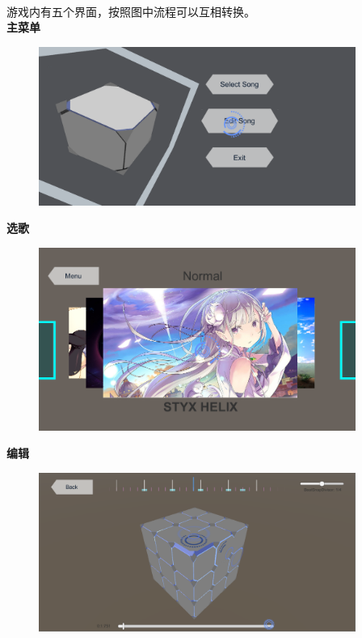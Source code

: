 \documentclass{article}
\begin{document}
\paragraph{}
游戏内有五个界面，按照图中流程可以互相转换。\\
\textbf{主菜单}
\begin{figure}[H]
  \centering
  \includegraphics[width=28em]{mainMenu.png}\\
  \caption{}\label{}
\end{figure}
\newpage
\textbf{选歌}
\begin{figure}[H]
  \centering
  \includegraphics[width=28em]{selectMusic.png}\\
  \caption{}\label{}
\end{figure}
\textbf{编辑}
\begin{figure}[H]
  \centering
  \includegraphics[width=28em]{edit.png}\\
  \caption{}\label{}
\end{figure}
\end{document}
